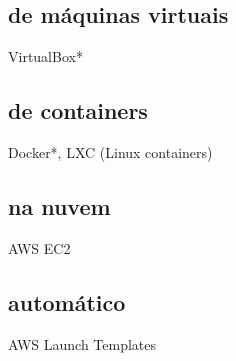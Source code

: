 \subsection{de máquinas virtuais}
VirtualBox*

\subsection{de containers}
Docker*, LXC (Linux containers)

\subsection{na nuvem}
AWS EC2

\subsection{automático}
AWS Launch Templates







